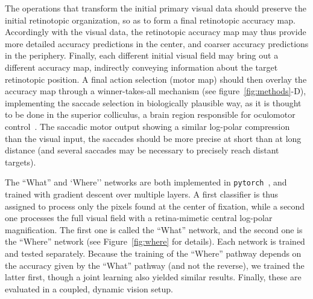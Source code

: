 


The operations that transform the initial primary visual data should preserve the initial retinotopic organization, so as to form a final retinotopic accuracy map. %
Accordingly with the visual data, the retinotopic accuracy map may thus provide more detailed accuracy predictions in the center, and coarser accuracy predictions in the periphery.
Finally, each different initial visual field may bring out a different accuracy map, indirectly conveying information about the target retinotopic position.
A final action selection (motor map) should then overlay the accuracy map through a winner-takes-all mechanism (see figure~\ref{fig:methods}-D), implementing the saccade selection in biologically plausible way, as it is thought to be done in the superior colliculus, a brain region responsible for oculomotor control~\cite{sparks1987sensory}.
The saccadic motor output showing a similar log-polar compression than the visual input, the saccades should be more precise at short than at long distance (and several saccades may be necessary to precisely reach distant targets). %
%

The ``What'' and `Where'' networks are both implemented in \texttt{pytorch}~\cite{NEURIPS2019_9015}, and trained with gradient descent over multiple layers. A first classifier is thus assigned to process only the pixels found at the center of fixation, while a second one processes the full visual field with a retina-mimetic central log-polar magnification. The first one is called the ``What'' network, and the second one is the ``Where'' network (see Figure~\ref{fig:where} for details).
Each network is trained and tested separately. Because the training of the ``Where'' pathway depends on the accuracy given by the ``What'' pathway (and not the reverse), we trained the latter first, though a joint learning also yielded similar results. %
Finally, these are evaluated in a coupled, dynamic vision setup.



